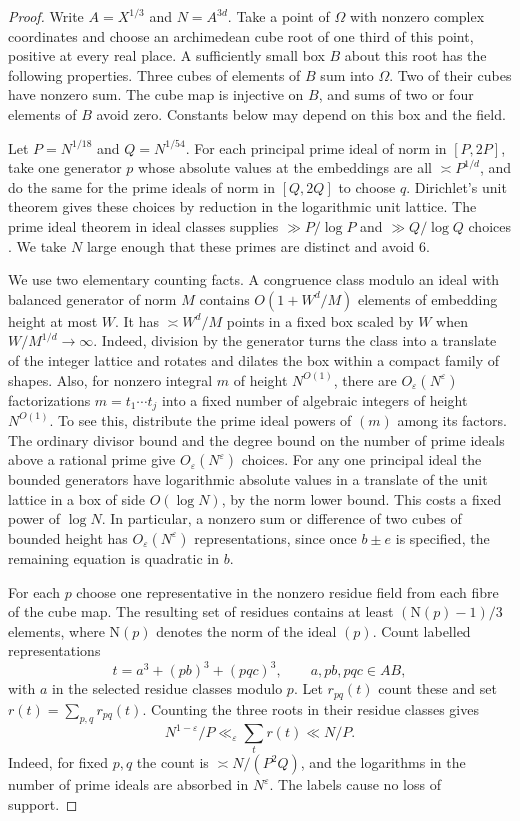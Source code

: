 \documentclass[11pt,letterpaper]{article}
\theoremstyle{definition}
\numberwithin{equation}{section}
\begin{document}
\begin{proof}
Write $A=X^{1/3}$ and $N=A^{3d}$. Take a point of $\Omega$ with nonzero
complex coordinates and choose an archimedean cube root of one third of
this point, positive at every real place. A sufficiently small box $B$
about this root has the following properties. Three cubes of elements of
$B$ sum into $\Omega$. Two of their cubes have nonzero sum.
The cube map is injective on $B$, and sums of two or four elements of $B$
avoid zero. Constants below may depend on this box and the field.

Let $P=N^{1/18}$ and $Q=N^{1/54}$. For each principal prime ideal of norm
in $[P,2P]$, take one generator $p$ whose absolute values at the embeddings
are all $\asymp P^{1/d}$, and do the same for the prime ideals of norm in $[Q,2Q]$ to choose $q$.
Dirichlet's unit theorem gives these choices by reduction in the logarithmic
unit lattice. The prime ideal theorem in ideal classes supplies
$\gg P/\log P$ and $\gg Q/\log Q$ choices
\cite{nf3:neukirch}. We take $N$ large enough that these primes are distinct
and avoid $6$.

We use two elementary counting facts. A congruence class modulo an ideal
with balanced generator of norm $M$ contains $O(1+W^d/M)$ elements of
embedding height at most $W$. It has $\asymp W^d/M$ points in a fixed
box scaled by $W$ when $W/M^{1/d}\to\infty$. Indeed, division by the
generator turns the class into a translate of the integer lattice and
rotates and dilates the box within a compact family of shapes.
Also, for nonzero integral $m$ of height $N^{O(1)}$, there are
$O_\varepsilon(N^\varepsilon)$ factorizations $m=t_1\cdots t_j$ into
a fixed number of algebraic integers of height $N^{O(1)}$. To see this,
distribute the prime ideal powers of $(m)$ among its factors. The ordinary
divisor bound and the degree bound on the number of prime ideals above a
rational prime give $O_\varepsilon(N^\varepsilon)$ choices. For any one
principal ideal the bounded generators have logarithmic absolute values
in a translate of the unit lattice in a box of side $O(\log N)$, by the
norm lower bound. This costs a fixed power of $\log N$. In particular,
a nonzero sum or difference of two cubes of bounded height has
$O_\varepsilon(N^\varepsilon)$ representations, since once $b\pm e$ is
specified, the remaining equation is quadratic in $b$.

For each $p$ choose one representative in the nonzero residue field
from each fibre of the cube map. The resulting set of residues contains
at least $(\mathrm N(p)-1)/3$ elements, where $\mathrm N(p)$ denotes
the norm of the ideal $(p)$. Count labelled representations
\[
 t=a^3+(pb)^3+(pqc)^3,\qquad a,pb,pqc\in AB,
\]
with $a$ in the selected residue classes modulo $p$.
Let $r_{pq}(t)$ count these and set $r(t)=\sum_{p,q}r_{pq}(t)$.
Counting the three roots in their residue classes gives
\begin{equation}\label{nf3:first}
 N^{1-\varepsilon}/P\ll_\varepsilon \sum_t r(t)\ll N/P.
\end{equation}
Indeed, for fixed $p,q$ the count is $\asymp N/(P^2Q)$, and the
logarithms in the number of prime ideals are absorbed in $N^\varepsilon$.
The labels cause no loss of support.


\end{proof}
\end{document}
